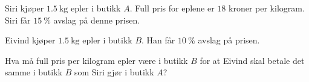 %



\Oppgave[2] 

Siri kjøper $\SI{1,5}{\kg}$ epler i butikk $A$. Full pris for eplene er $18$
kroner per kilogram.  Siri får $\SI{15}{\percent}$ avslag på denne prisen.
\medskip

Eivind kjøper $\SI{1,5}{\kg}$ epler i butikk $B$. Han får $\SI{10}{\percent}$
avslag på prisen. \medskip

Hva må full pris per kilogram epler være i butikk $B$ for at Eivind skal betale
det samme i butikk $B$ som Siri gjør i butikk $A$?


\Oppgave[4] %

